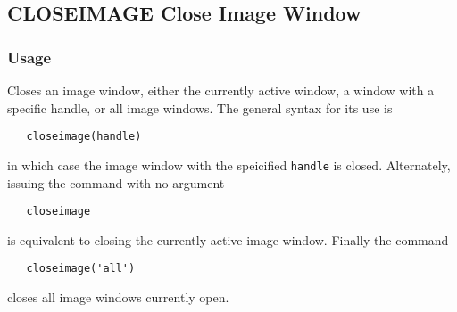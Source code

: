 %
%
%
\subsection{CLOSEIMAGE Close Image Window}
\subsubsection{Usage}
Closes an image window, either the currently active window, a 
window with a specific handle, or all image windows.  The general
syntax for its use is
\begin{verbatim}
   closeimage(handle)
\end{verbatim}
in which case the image window with the speicified \verb|handle| is
closed.  Alternately, issuing the command with no argument
\begin{verbatim}
   closeimage
\end{verbatim}
is equivalent to closing the currently active image window.  Finally
the command
\begin{verbatim}
   closeimage('all')
\end{verbatim}
closes all image windows currently open.
